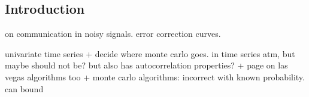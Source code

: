 
\subsection{Introduction}

on communication in noisy signals. error correction curves.

univariate time series
+ decide where monte carlo goes. in time series atm, but maybe should not be? but also has autocorrelation properties?
+ page on las vegas algorithms too
+ monte carlo algorithms: incorrect with known probability. can bound


